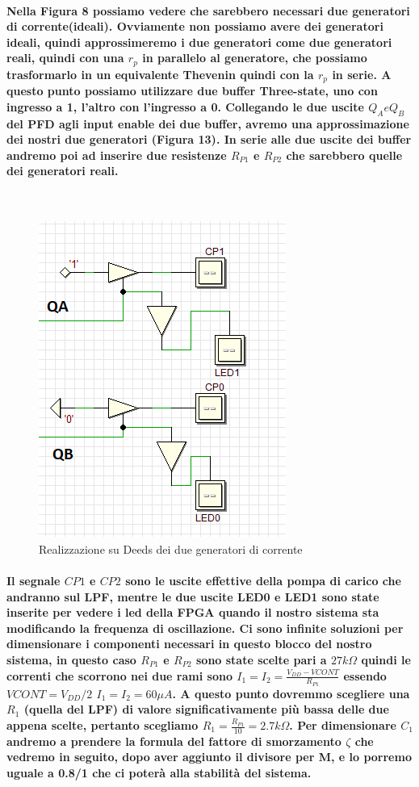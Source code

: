 \documentclass{article}
\begin{document}
\paragraph{Nella Figura 8 possiamo vedere che sarebbero necessari due generatori di corrente(ideali).
Ovviamente non possiamo avere dei generatori ideali, quindi approssimeremo i due generatori come due generatori reali, quindi con una $r_p$ in parallelo al generatore, che possiamo trasformarlo in un equivalente Thevenin quindi con la $r_p$ in serie.
A questo punto possiamo utilizzare due buffer Three-state, uno con ingresso a 1, l'altro con l'ingresso a 0. Collegando le due uscite $Q_A e Q_B$ del PFD agli input enable dei due buffer, avremo una approssimazione dei nostri due generatori (Figura 13). In serie alle due uscite dei buffer andremo poi ad inserire due resistenze $R_{P1}$ e  $R_{P2}$ che sarebbero quelle dei generatori reali.}
~\begin{figure}[!h]%
\includegraphics[scale=0.8]{CPDeeds.png} 
\centering
\caption{Realizzazione su Deeds dei due generatori di corrente}
\label{fig:foo}
\end{figure}
\paragraph{Il segnale $CP1$ e $CP2$ sono le uscite effettive della pompa di carico che andranno sul LPF, mentre le due uscite LED0 e LED1 sono state inserite per vedere i led della FPGA quando il nostro sistema sta modificando la frequenza di oscillazione. Ci sono infinite soluzioni per dimensionare i componenti necessari in questo blocco del nostro sistema, in questo caso $R_{P1}$ e  $R_{P2}$ sono state scelte pari a $27k\Omega$ quindi le correnti che scorrono nei due rami sono $I_1=I_2=\frac{V_{DD}-V{CONT}}{R_{P1}}$ essendo $V{CONT}=V_{DD}/2$ $I_1=I_2=60\mu A$. A questo punto dovremmo scegliere una $R_1$ (quella del LPF) di valore significativamente più bassa delle due appena scelte, pertanto scegliamo $R_1=\frac{R_{P1}}{10}=2.7k\Omega$.
Per dimensionare $C_1$ andremo a prendere la formula del fattore di smorzamento $\zeta$ che vedremo in seguito, dopo aver aggiunto il divisore per M, e lo porremo uguale a 0.8/1 che ci poterà alla stabilità del sistema. }
\end{document}
